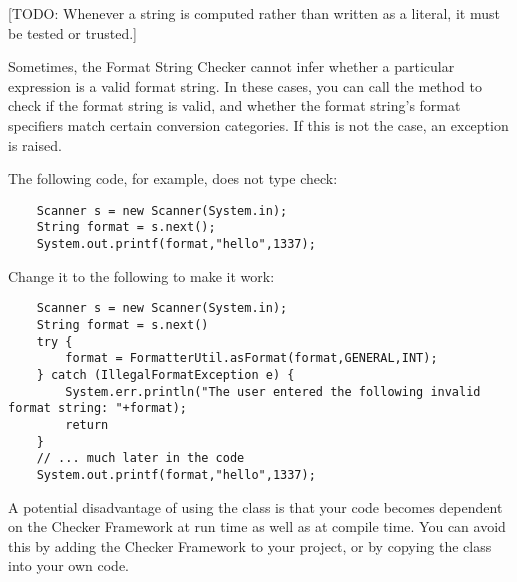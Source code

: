 
[TODO: Whenever a string is computed rather than written as a literal, it
must be tested or trusted.]


Sometimes, the Format String Checker cannot infer whether a particular
expression is a valid format string. In these cases, you can call the
method to check if the format string is valid, and whether the
format string's format specifiers match certain conversion categories.
If this is not the case, an exception is raised.

The following code, for example, does not type check:

\begin{Verbatim}
    Scanner s = new Scanner(System.in);    
    String format = s.next();
    System.out.printf(format,"hello",1337); 
\end{Verbatim}

\noindent Change it to the following to make it work:

\begin{Verbatim}
    Scanner s = new Scanner(System.in);
    String format = s.next()
    try {
        format = FormatterUtil.asFormat(format,GENERAL,INT); 
    } catch (IllegalFormatException e) {
        System.err.println("The user entered the following invalid format string: "+format);
        return
    }
    // ... much later in the code
    System.out.printf(format,"hello",1337); 
\end{Verbatim}

\noindent A potential disadvantage of using the  class is that your code becomes
dependent on the Checker Framework at run time as well as at compile time. You
can avoid this by adding the Checker Framework to your project, or by copying
the  class into your own code.

